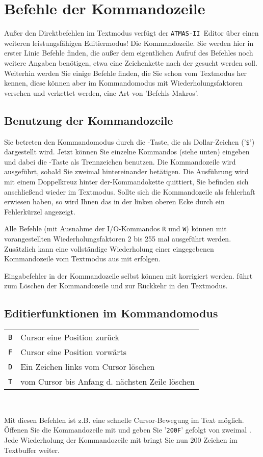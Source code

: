 \documentclass[10pt,a4paper,twoside,final,openright,titlepage]{memoir}
\def\atmas{\texttt{AT\-MAS-II }}
\newcommand{\key}[1]{\keystroke{\tiny #1}}
\begin{document}
\section{Befehle der Kommandozeile}

Außer den Direktbefehlen im Textmodus verfügt der
\atmas Editor über einen weiteren leistungsfähigen
Editiermodus! Die Kommandozeile. Sie werden hier in
erster Linie Befehle finden, die außer dem
eigentlichen Aufruf des Befehles noch weitere Angaben
benötigen, etwa eine Zeichenkette nach der gesucht
werden soll. Weiterhin werden Sie einige Befehle
finden, die Sie schon vom Textmodus her kennen, diese
können aber im Kommandomodus mit Wiederholungsfaktoren
versehen und verkettet werden, eine Art von
'Befehls-Makros'.

\subsection{Benutzung der Kommandozeile}

Sie betreten den Kommandomodus durch die \key{ESC}-Taste,
die als Dollar-Zeichen ('\texttt{\$}') dargestellt wird. Jetzt
können Sie einzelne Kommandos (siehe unten) eingeben
und dabei die \key{ESC}-Taste als Trennzeichen benutzen.
Die Kommandozeile wird ausgeführt, sobald Sie \key{ESC}
zweimal hintereinander betätigen. Die Ausführung wird
mit einem Doppelkreuz hinter der-Kommandokette
quittiert, Sie befinden sich anschließend wieder im
Textmodus. Sollte sich die Kommandozeile als
fehlerhaft erwiesen haben, so wird Ihnen das in der
linken oberen Ecke durch ein Fehlerkürzel angezeigt.

Alle Befehle (mit Ausnahme der I/O-Kommandos \texttt{R} und \texttt{W})
können mit vorangestellten Wiederholungsfaktoren 2 bis
255 mal ausgeführt werden. Zu\-sätz\-lich kann eine
vollständige Wiederholung einer eingegebenen
Kommandozeile vom Textmodus aus mit \key{CTRL-G} erfolgen.

Eingabefehler in der Kommandozeile selbst können mit
\key{BACKSPACE} korrigiert werden. \key{CTRL-X} führt zum
Löschen der Kommandozeile und zur Rückkehr in den
Textmodus.

\subsection{Editierfunktionen im Kommandomodus}

\renewcommand{\arraystretch}{1.2}
\begin{tabular}{ll}
\texttt{B} & Cursor eine Position zurück \\
\texttt{F} & Cursor eine Position vorwärts \\
\texttt{D} & Ein Zeichen links vom Cursor löschen \\
\texttt{T} & vom Cursor bis Anfang d. nächsten Zeile löschen \\
\end{tabular}
\\
\par
Mit diesen Befehlen ist z.B. eine schnelle Cursor-Bewegung
im Text möglich. Öffenen Sie die Kommandozeile mit \key{ESC} und geben Sie '\texttt{200F}' gefolgt von
zweimal \key{ESC}. Jede Wiederholung der Kommandozeile mit
\key{CTRL-G} bringt Sie nun 200 Zeichen im Textbuffer
weiter.
\end{document}
